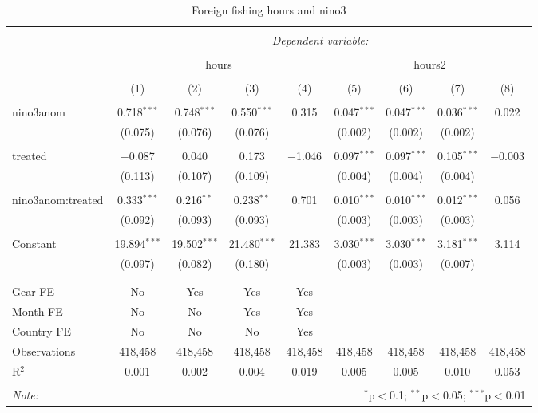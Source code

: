 \documentclass[]{article}
\begin{document}
\begin{table}[!htbp] \centering 
  \caption{\label{tab:ff_reg}Foreign fishing hours and nino3} 
  \label{} 
\begin{tabular}{@{\extracolsep{5pt}}lcccccccc} 
\\[-1.8ex]\hline 
\hline \\[-1.8ex] 
 & \multicolumn{8}{c}{\textit{Dependent variable:}} \\ 
\cline{2-9} 
\\[-1.8ex] & \multicolumn{4}{c}{hours} & \multicolumn{4}{c}{hours2} \\ 
\\[-1.8ex] & (1) & (2) & (3) & (4) & (5) & (6) & (7) & (8)\\ 
\hline \\[-1.8ex] 
 nino3anom & 0.718$^{***}$ & 0.748$^{***}$ & 0.550$^{***}$ & 0.315 & 0.047$^{***}$ & 0.047$^{***}$ & 0.036$^{***}$ & 0.022 \\ 
  & (0.075) & (0.076) & (0.076) &  & (0.002) & (0.002) & (0.002) &  \\ 
  & & & & & & & & \\ 
 treated & $-$0.087 & 0.040 & 0.173 & $-$1.046 & 0.097$^{***}$ & 0.097$^{***}$ & 0.105$^{***}$ & $-$0.003 \\ 
  & (0.113) & (0.107) & (0.109) &  & (0.004) & (0.004) & (0.004) &  \\ 
  & & & & & & & & \\ 
 nino3anom:treated & 0.333$^{***}$ & 0.216$^{**}$ & 0.238$^{**}$ & 0.701 & 0.010$^{***}$ & 0.010$^{***}$ & 0.012$^{***}$ & 0.056 \\ 
  & (0.092) & (0.093) & (0.093) &  & (0.003) & (0.003) & (0.003) &  \\ 
  & & & & & & & & \\ 
 Constant & 19.894$^{***}$ & 19.502$^{***}$ & 21.480$^{***}$ & 21.383 & 3.030$^{***}$ & 3.030$^{***}$ & 3.181$^{***}$ & 3.114 \\ 
  & (0.097) & (0.082) & (0.180) &  & (0.003) & (0.003) & (0.007) &  \\ 
  & & & & & & & & \\ 
\hline \\[-1.8ex] 
Gear FE & No & Yes & Yes & Yes &  &  &  &  \\ 
Month FE & No & No & Yes & Yes &  &  &  &  \\ 
Country FE & No & No & No & Yes &  &  &  &  \\ 
Observations & 418,458 & 418,458 & 418,458 & 418,458 & 418,458 & 418,458 & 418,458 & 418,458 \\ 
R$^{2}$ & 0.001 & 0.002 & 0.004 & 0.019 & 0.005 & 0.005 & 0.010 & 0.053 \\ 
\hline 
\hline \\[-1.8ex] 
\textit{Note:}  & \multicolumn{8}{r}{$^{*}$p$<$0.1; $^{**}$p$<$0.05; $^{***}$p$<$0.01} \\ 
\end{tabular} 
\end{table}
\end{document}
